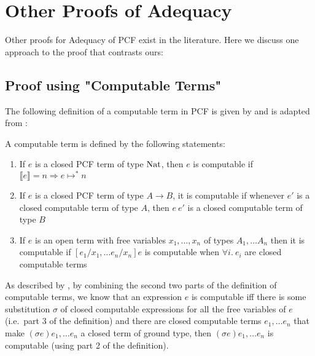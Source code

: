 \section{Other Proofs of Adequacy}\label{ch8}
Other proofs for Adequacy of PCF exist in the literature. Here we discuss one approach to the proof that contrasts ours:

\subsection{Proof using "Computable Terms"}
The following definition of a computable term in PCF is given by \citep{Gunter92} and is adapted from \citep{Plotkin77}:

\vspace{0.5cm}

\begin{defn} A computable term is defined by the following statements:
\begin{enumerate}
\item{If $e$ is a closed PCF term of type $\operatorname{Nat}$, then $e$ is computable if $\llbracket e \rrbracket = n \Rightarrow e \mapsto^* n$}
\item{If $e$ is a closed PCF term of type $A \to B$, it is computable if whenever $e'$ is a closed computable term of type $A$, then $e \ e'$ is a closed computable term of type $B$}
\item{If $e$ is an open term with free variables $x_1, \dots, x_n$ of types $A_1, \dots A_n$ then it is computable if $[e_1/x_1, \dots e_n/x_n]e$ is computable when $\forall i. \ e_i$ are closed computable terms}
\end{enumerate}
\end{defn}  

As described by \citep{Gunter92}, by combining the second two parts of the definition of computable terms, we know that an expression $e$ is computable iff there is some substitution $\sigma$ of closed computable expressions for all the free variables of $e$ (i.e.\ part 3 of the definition) and there are closed computable terms $e_1, \dots e_n$ that make $(\sigma e)e_1, \dots e_n$ a closed term of ground type, then  $(\sigma e)e_1, \dots e_n$ is computable (using part 2 of the definition).  


